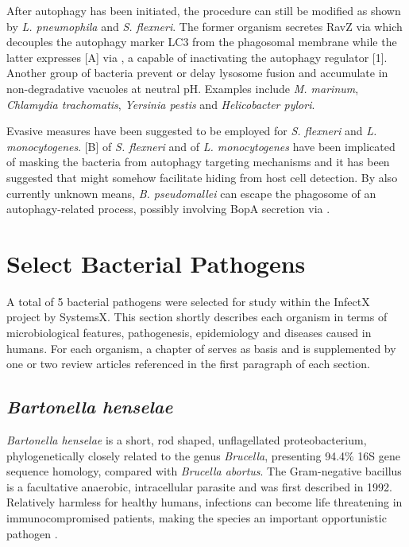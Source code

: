 After autophagy has been initiated, the procedure can still be modified as shown by \textit{L. pneumophila} and \textit{S. flexneri}. The former organism secretes RavZ via  which decouples the autophagy marker LC3 from the phagosomal membrane while the latter expresses [A] via , a capable of inactivating the autophagy regulator [1]. Another group of bacteria prevent or delay lysosome fusion and accumulate in non-degradative vacuoles at neutral pH. Examples include \textit{M. marinum}, \textit{Chlamydia trachomatis}, \textit{Yersinia pestis} and \textit{Helicobacter pylori}.

Evasive measures have been suggested to be employed for \textit{S. flexneri} and \textit{L. monocytogenes}. [B] of \textit{S. flexneri} and  of \textit{L. monocytogenes} have been implicated of masking the bacteria from autophagy targeting mechanisms and it has been suggested that  might somehow facilitate hiding from host cell detection. By also currently unknown means, \textit{B. pseudomallei} can escape the phagosome of an autophagy-related process, possibly involving BopA secretion via .

\section{Select Bacterial Pathogens}

A total of 5 bacterial pathogens were selected for study within the InfectX  project by SystemsX. This section shortly describes each organism in terms of microbiological features, pathogenesis, epidemiology and diseases caused in humans. For each organism, a chapter of \citet{Gillespie2006} serves as basis and is supplemented by one or two review articles referenced in the first paragraph of each section.

\subsection{\textit{Bartonella henselae}}

\textit{Bartonella henselae} is a short, rod shaped, unflagellated proteobacterium, phylogenetically closely related to the genus \textit{Brucella}, presenting 94.4\% 16S  gene sequence homology, compared with \textit{Brucella abortus}. The Gram-negative bacillus is a facultative anaerobic, intracellular parasite and was first described in 1992. Relatively harmless for healthy humans, infections can become life threatening in immunocompromised patients, making the species an important opportunistic pathogen \citep{Anderson1997,Harms2012}.


